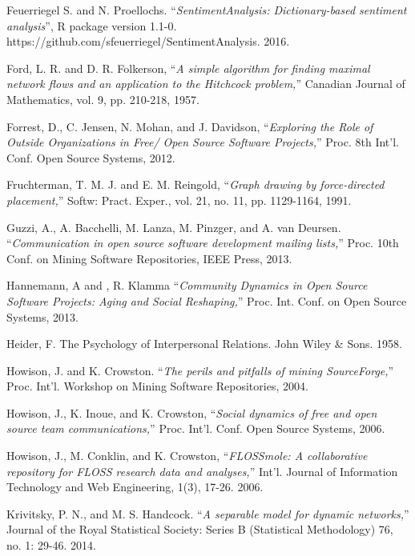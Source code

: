\begin{thebibliography}{99.}
 Feuerriegel S. and N. Proellochs. ``\textit{SentimentAnalysis: Dictionary-based sentiment analysis}'', R package version 1.1-0.
https://github.com/sfeuerriegel/SentimentAnalysis. 2016.

 Ford, L. R. and D. R. Folkerson, ``\textit{A simple algorithm for finding maximal network flows and an application to the Hitchcock problem,}'' Canadian Journal of Mathematics, vol. 9, pp. 210-218, 1957. 

 Forrest, D., C. Jensen, N. Mohan, and J. Davidson, ``\textit{Exploring the Role of Outside Organizations in Free/ Open Source Software Projects,}'' Proc. 8th Int'l. Conf. Open Source Systems, 2012.

 Fruchterman, T. M. J. and E. M. Reingold, ``\textit{Graph drawing by force-directed placement,}'' Softw: Pract. Exper., vol. 21, no. 11, pp. 1129-1164, 1991.

 Guzzi, A., A. Bacchelli, M. Lanza, M. Pinzger, and A. van Deursen. ``\textit{Communication in open source software development mailing lists,}'' Proc. 10th Conf. on Mining Software Repositories, IEEE Press, 2013.

 Hannemann, A and , R. Klamma ``\textit{Community Dynamics in Open Source Software Projects: Aging and Social Reshaping,}'' Proc. Int. Conf. on Open Source Systems, 2013. 

 Heider, F. The Psychology of Interpersonal Relations. John Wiley \& Sons. 1958.

 Howison, J. and K. Crowston. ``\textit{The perils and pitfalls of mining SourceForge,}'' Proc. Int'l. Workshop on Mining Software Repositories, 2004.  

 Howison, J., K. Inoue, and K. Crowston, ``\textit{Social dynamics of free and open source team communications,}'' Proc. Int'l. Conf. Open Source Systems, 2006.  

 Howison, J., M. Conklin, and K. Crowston, ``\textit{FLOSSmole: A collaborative repository for FLOSS research data and analyses,}'' Int'l. Journal of Information Technology and Web Engineering, 1(3), 17-26. 2006.

 Krivitsky, P. N., and M. S. Handcock. ``\textit{A separable model for dynamic networks,}'' Journal of the Royal Statistical Society: Series B (Statistical Methodology) 76, no. 1: 29-46. 2014.


\end{thebibliography}
